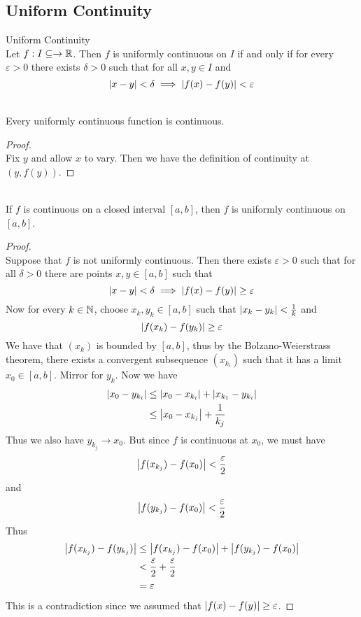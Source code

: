 \documentclass[a4paper]{article}
\begin{document}
\subsection{Uniform Continuity}
\begin{defn}{Uniform Continuity}{}\\ Let $f:I\subseteq\to\mathbb{R}$. Then $f$ is uniformly continuous on $I$ if and only if for every $\varepsilon>0$ there exists $\delta>0$ such that for all $x,y\in I$ and $$\abs{x-y}<\delta\implies\abs{f(x)-f(y)}<\varepsilon$$ 
\end{defn}

\begin{prp}{}{}\\ Every uniformly continuous function is continuous. 
\begin{proof}\\ Fix $y$ and allow $x$ to vary. Then we have the definition of continuity at $(y,f(y))$. 
\end{proof}
\end{prp}

\begin{thm}{}{}\\ If $f$ is continuous on a closed interval $[a,b]$, then $f$ is uniformly continuous on $[a,b]$. 
\begin{proof}\\ Suppose that $f$ is not uniformly continuous. Then there exists $\varepsilon>0$ such that for all $\delta>0$ there are points $x,y\in[a,b]$ such that $$\abs{x-y}<\delta\implies\abs{f(x)-f(y)}\geq\varepsilon$$ Now for every $k\in\mathbb{N}$, choose $x_k,y_k\in[a,b]$ such that $\abs{x_k-y_k}<\frac{1}{k}$ and $$\abs{f(x_k)-f(y_k)}\geq\varepsilon$$ We have that $(x_k)$ is bounded by $[a,b]$, thus by the Bolzano-Weierstrass theorem, there exists a convergent subsequence $(x_{k_i})$ such that it has a limit $x_0\in[a,b]$. Mirror for $y_k$. Now we have 
\begin{align*}
\abs{x_0-y_{k_i}}&\leq\abs{x_0-x_{k_i}}+\abs{x_{k_1}-y_{k_i}}\\
&\leq\abs{x_0-x_{k_j}}+\frac{1}{k_j}
\end{align*}
Thus we also have $y_{k_j}\to x_0$. But since $f$ is continuous at $x_0$, we must have $$\abs{f(x_{k_j})-f(x_0)}<\frac{\varepsilon}{2}$$ and $$\abs{f(y_{k_j})-f(x_0)}<\frac{\varepsilon}{2}$$ Thus
\begin{align*}
\abs{f(x_{k_j})-f(y_{k_j})}&\leq\abs{f(x_{k_j})-f(x_0)}+\abs{f(y_{k_j})-f(x_0)}\\
&<\frac{\varepsilon}{2}+\frac{\varepsilon}{2}\\
&=\varepsilon
\end{align*} This is a contradiction since we assumed that $\abs{f(x)-f(y)}\geq\varepsilon$. 
\end{proof}
\end{thm}
\end{document}
